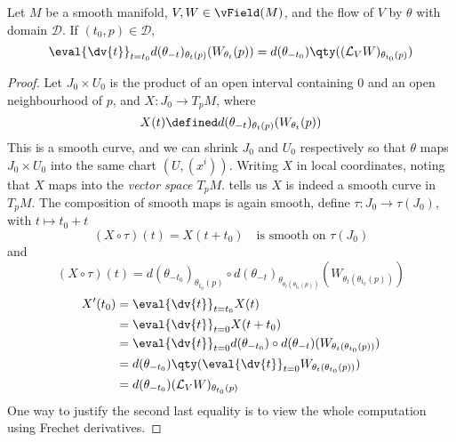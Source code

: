 \documentclass[../main-v2-manifolds.tex]{subfiles}
\begin{document}
\begin{wts}\label{lee-chp9:prop-9.41}
    Let $M$ be a smooth manifold, $V,W\in\vField(M)$, and the flow of $V$ by $\theta$ with domain $\mathcal{D}$. If $(t_0, p)\in \mathcal{D}$,
    \[
        \eval{\dv{t}}_{t=t_0} d(\theta_{-t})_{\theta_t(p)}(W_{\theta_t}(p)) = d(\theta_{-t_0})\qty((\mathcal{L}_V W)_{\theta_{t_0}(p)})
    \]
\end{wts}
\begin{proof}
    Let $J_0\times U_0$ is the product of an open interval containing $0$ and an open neighbourhood of $p$, and $X: J_0\to T_pM$, where
    \[
        X(t)\defined d(\theta_{-t})_{\theta_t(p)}(W_{\theta_t}(p))
    \]
    This is a smooth curve, and we can shrink $J_0$ and $U_0$ respectively so that $\theta$ maps $J_0\times U_0$ into the same chart $(U, (x^i))$. Writing $X$ in local coordinates, noting that $X$ maps into the \emph{vector space $T_pM$}.  tells us $X$ is indeed a smooth curve in $T_pM$. The composition of smooth maps is again smooth, define $\tau: J_0\to \tau(J_0)$, with $t\mapsto t_0 + t$
    \[
        (X\circ \tau)(t) = X(t+t_0)\quad\text{is smooth on }\tau(J_0)
    \]
    and
    \[
        (X\circ \tau)(t) = d(\theta_{-t_0})_{\theta_{t_0}(p)}\circ d(\theta_{-t})_{\theta_{\theta_{t}(\theta_{t_0}(p))}}(W_{\theta_{t}(\theta_{t_0}(p))})
    \]
    \begin{align*}
        X'(t_0) &=\eval{\dv{t}}_{t=t_0} X(t)\\
        &= \eval{\dv{t}}_{t=0} X(t + t_0)\\
        &= \eval{\dv{t}}_{t=0} d(\theta_{-t_0})\circ d(\theta_{-t})(W_{\theta_{t}(\theta_{t_0}(p))})\\
        &= d(\theta_{-t_0})\qty(\eval{\dv{t}}_{t=0} W_{\theta_t(\theta_{t_0}(p))} )\\
        &= d(\theta_{-t_0})(\mathcal{L}_VW)_{\theta_{t_0}(p)}
    \end{align*}
    One way to justify the second last equality is to view the whole computation using Frechet derivatives.
\end{proof}
\end{document}
